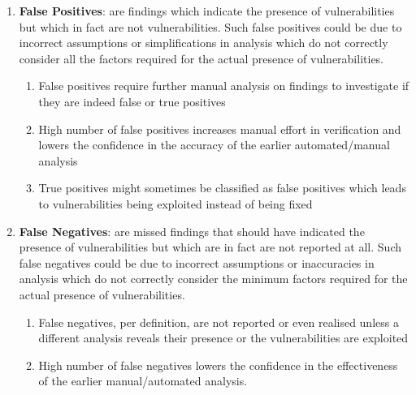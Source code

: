 \begin{enumerate}
\item\textbf{False Positives}: are findings which indicate the presence of vulnerabilities but which in fact are not vulnerabilities. Such false positives could be due to incorrect assumptions or simplifications in analysis which do not correctly consider all the factors required for the actual presence of vulnerabilities.
	\begin{enumerate}
	\item False positives require further manual analysis on findings to investigate if they are indeed false or true positives
	\item High number of false positives increases manual effort in verification and lowers the confidence in the accuracy of the earlier automated/manual analysis
	\item True positives might sometimes be classified as false positives which leads to vulnerabilities being exploited instead of being fixed
	\end{enumerate}

\item\textbf{False Negatives}: are missed findings that should have indicated the presence of vulnerabilities but which are in fact are not reported at all. Such false negatives could be due to incorrect assumptions or inaccuracies in analysis which do not correctly consider the minimum factors required for the actual presence of vulnerabilities.
	\begin{enumerate}
	\item False negatives, per definition, are not reported or even realised unless a different analysis reveals their presence or the vulnerabilities are exploited
	\item High number of false negatives lowers the confidence in the effectiveness of the earlier manual/automated analysis.
	\end{enumerate}


\end{enumerate}
